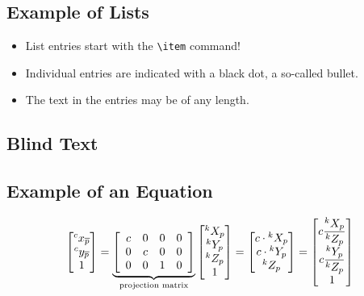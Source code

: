 \documentclass[class=scrbook, crop=false]{standalone}
\begin{document}
    \subsection{Example of Lists}
    \begin{itemize}
      \item List entries start with the \verb|\item| command!
      \item Individual entries are indicated with a black dot, a so-called bullet.
      \item The text in the entries may be of any length.
    \end{itemize}
    
    \subsection{Blind Text}
    \Blindtext
    
    \subsection{Example of an Equation}
    \begin{equation}
        \label{eq::Central_Projection}
            \left[\begin{array}{@{}c@{}} {}^c x_{\overline{p}} \\ {}^c y_{\overline{p}} \\ 1 \end{array} \right] =
            \underbrace{\left[\begin{array}{cccc}
                c & 0 & 0 & 0 \\
                0 & c & 0 & 0 \\
                0 & 0 & 1 & 0
            \end{array} \right]}_{\text{projection matrix}}
            \left[\begin{array}{@{}c@{}} {}^k X_p \\ {}^k Y_p \\ {}^k Z_p \\ 1 \end{array} \right] =
            \left[\begin{array}{@{}c@{}} c \cdot {}^k X_p \\ c \cdot {}^k Y_p \\ {}^k Z_p \end{array} \right] =
            \left[\begin{array}{@{}c@{}} c \dfrac{{}^k X_p}{{}^k Z_p} \\ c \dfrac{{}^k Y_p}{{}^k Z_p} \\ 1 \end{array} \right]
    \end{equation}
    
\end{document}
